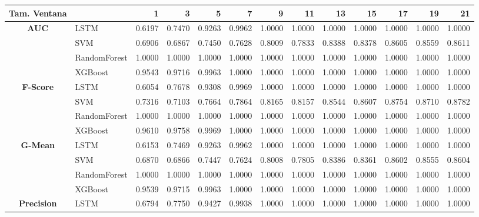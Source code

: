 \begin{table}[h]
	\centering
	\begin{adjustbox}{max width=15cm}
		\begin{tabular}{|c|l|r|r|r|r|r|r|r|r|r|r|r|}
			\hline
			\textbf{Tam. Ventana}&         &      1  &      3  &      5  &      7  &      9  &      11 &      13 &      15 &      17 &      19 &      21 \\
			\hline
			\textbf{AUC} & LSTM &  0.6197 &  0.7470 &  0.9263 &  0.9962 &  1.0000 &  1.0000 &  1.0000 &  1.0000 &  1.0000 &  1.0000 &  1.0000 \\
			& SVM &  0.6906 &  0.6867 &  0.7450 &  0.7628 &  0.8009 &  0.7833 &  0.8388 &  0.8378 &  0.8605 &  0.8559 &  0.8611 \\
			& RandomForest &  1.0000 &  1.0000 &  1.0000 &  1.0000 &  1.0000 &  1.0000 &  1.0000 &  1.0000 &  1.0000 &  1.0000 &  1.0000 \\
			& XGBoost &  0.9543 &  0.9716 &  0.9963 &  1.0000 &  1.0000 &  1.0000 &  1.0000 &  1.0000 &  1.0000 &  1.0000 &  1.0000 \\
			\hline
			\textbf{F-Score} & LSTM &  0.6054 &  0.7678 &  0.9308 &  0.9969 &  1.0000 &  1.0000 &  1.0000 &  1.0000 &  1.0000 &  1.0000 &  1.0000 \\
			& SVM &  0.7316 &  0.7103 &  0.7664 &  0.7864 &  0.8165 &  0.8157 &  0.8544 &  0.8607 &  0.8754 &  0.8710 &  0.8782 \\
			& RandomForest &  1.0000 &  1.0000 &  1.0000 &  1.0000 &  1.0000 &  1.0000 &  1.0000 &  1.0000 &  1.0000 &  1.0000 &  1.0000 \\
			& XGBoost &  0.9610 &  0.9758 &  0.9969 &  1.0000 &  1.0000 &  1.0000 &  1.0000 &  1.0000 &  1.0000 &  1.0000 &  1.0000 \\
			\hline
			\textbf{G-Mean} & LSTM &  0.6153 &  0.7469 &  0.9263 &  0.9962 &  1.0000 &  1.0000 &  1.0000 &  1.0000 &  1.0000 &  1.0000 &  1.0000 \\
			& SVM &  0.6870 &  0.6866 &  0.7447 &  0.7624 &  0.8008 &  0.7805 &  0.8386 &  0.8361 &  0.8602 &  0.8555 &  0.8604 \\
			& RandomForest &  1.0000 &  1.0000 &  1.0000 &  1.0000 &  1.0000 &  1.0000 &  1.0000 &  1.0000 &  1.0000 &  1.0000 &  1.0000 \\
			& XGBoost &  0.9539 &  0.9715 &  0.9963 &  1.0000 &  1.0000 &  1.0000 &  1.0000 &  1.0000 &  1.0000 &  1.0000 &  1.0000 \\
			\hline
			\textbf{Precision} & LSTM &  0.6794 &  0.7750 &  0.9427 &  0.9938 &  1.0000 &  1.0000 &  1.0000 &  1.0000 &  1.0000 &  1.0000 &  1.0000 \\

\end{tabular}
\end{adjustbox}
\end{table}
